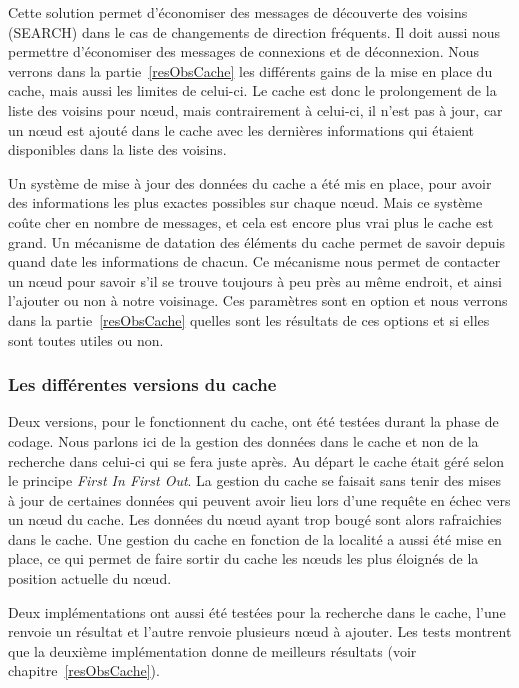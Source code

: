\par Cette solution permet d'économiser des messages de découverte des voisins (SEARCH) dans le cas de changements de direction fréquents. Il doit aussi nous permettre d'économiser des messages de connexions et de déconnexion. Nous verrons dans la partie~\ref{resObsCache} les différents gains de la mise en place du cache, mais aussi les limites de celui-ci. Le cache est donc le prolongement de la liste des voisins pour nœud, mais contrairement à celui-ci, il n'est pas à jour, car un nœud est ajouté dans le cache avec les dernières informations qui étaient disponibles dans la liste des voisins. 
\par Un système de mise à jour des données du cache a été mis en place, pour avoir des informations les plus exactes possibles sur chaque nœud. Mais ce système coûte cher en nombre de messages, et cela est encore plus vrai plus le cache est grand. Un mécanisme de datation des éléments du cache permet de savoir depuis quand date les informations de chacun. Ce mécanisme nous permet de contacter un nœud pour savoir s'il se trouve toujours à peu près au même endroit, et ainsi l'ajouter ou non à notre voisinage. Ces paramètres sont en option et nous verrons dans la partie~\ref{resObsCache} quelles sont les résultats de ces options et si elles sont toutes utiles ou non.

\subsubsection{Les différentes versions du cache}

Deux versions, pour le fonctionnent du cache, ont été testées durant la phase de codage. Nous parlons ici de la gestion des données dans le cache et non de la recherche dans celui-ci qui se fera juste après. Au départ le cache était géré selon le principe \textit{First In First Out}. La gestion du cache se faisait sans tenir des mises à jour de certaines données qui peuvent avoir lieu lors d'une requête en échec vers un nœud du cache. Les données du nœud ayant trop bougé sont alors rafraichies dans le cache. Une gestion du cache en fonction de la localité a aussi été mise en place, ce qui permet de faire sortir du cache les nœuds les plus éloignés de la position actuelle du nœud.
\par Deux implémentations ont aussi été testées pour la recherche dans le cache, l'une renvoie un résultat et l'autre renvoie plusieurs nœud à ajouter. Les tests montrent que la deuxième implémentation donne de meilleurs résultats (voir chapitre~\ref{resObsCache}).


